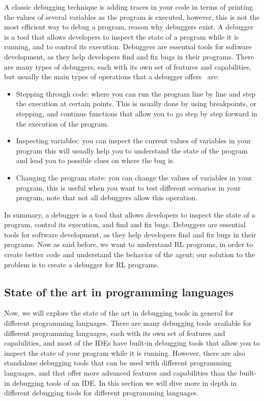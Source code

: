 A classic debugging technique is adding traces in your code in terms of printing the 
values of several variables as the program is executed, however, this is not the most 
efficient way to debug a program, reason why debuggers exist. A debugger is a tool 
that allows developers to inspect the state of a program while it is running, and to 
control its execution. Debuggers are essential tools for software development, as they 
help developers find and fix bugs in their programs. There are many types of 
debuggers, each with its own set of features and capabilities, but usually the main 
types of operations that a debugger offers~\cite{matloff08} are:

\begin{itemize}
    \item Stepping through code: where you can run the program line by line and step 
    the execution at certain points. This is usually done by using breakpoints, or stepping, 
    and continue functions that allow you to go step by step forward in the execution of
    the program.
    \item Inspecting variables: you can inspect the current values of variables in your 
    program this will usually help you to understand the state of the program and lead you 
    to possible clues on where the bug is.
    \item Changing the program state: you can change the values of variables in your program, 
    this is useful when you want to test different scenarios in your program, note that not
    all debuggers allow this operation.
\end{itemize}

In summary, a debugger is a tool that allows developers to inspect the state of a program,
control its execution, and find and fix bugs. Debuggers are essential tools for software 
development, as they help developers find and fix bugs in their programs. Now as said before, 
we want to understand \ac{RL} programs, in order to create better code and understand the behavior
of the agent; our solution to the problem is to create a debugger for \ac{RL} programs.

\subsection{State of the art in programming languages}
\label{sec:other}

Now, we will explore the state of the art in debugging tools in general for different 
programming languages. There are many debugging tools available for different programming 
languages, each with its own set of features and capabilities, and most of the IDEs have 
built-in debugging tools that allow you to inspect the state of your program while it is 
running. However, there are also standalone debugging tools that can be used with different 
programming languages, and that offer more advanced features and capabilities than the 
built-in debugging tools of an IDE. In this section we will dive more in depth in different 
debugging tools for different programming languages.


